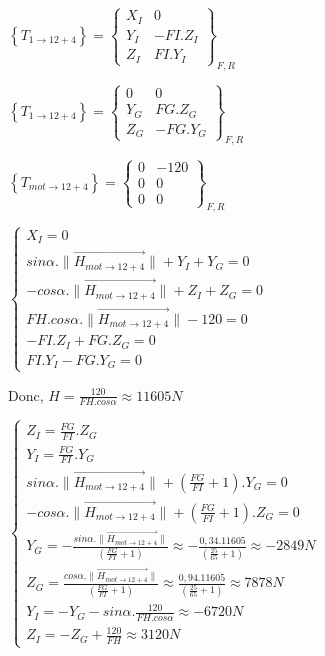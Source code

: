 $\left\{T_{1\rightarrow 12+4}\right\}=\left\{
\begin{array}{cc}
X_I & 0 \\
Y_I & -FI.Z_I \\
Z_I & FI.Y_I
\end{array}
\right\}_{F,R}$

$\left\{T_{1\rightarrow 12+4}\right\}=\left\{
\begin{array}{cc}
0 & 0 \\
Y_G & FG.Z_G \\
Z_G & -FG.Y_G
\end{array}
\right\}_{F,R}$

$\left\{T_{mot\rightarrow 12+4}\right\}=\left\{
\begin{array}{cc}
0 & -120 \\
0 & 0 \\
0 & 0
\end{array}
\right\}_{F,R}$


$\left\{
\begin{array}{l}
X_I=0 \\
sin\alpha.\|\overrightarrow{H_{mot\rightarrow 12+4}}\|+Y_I+Y_G=0 \\
-cos\alpha.\|\overrightarrow{H_{mot\rightarrow 12+4}}\|+Z_I+Z_G=0 \\
FH.cos\alpha.\|\overrightarrow{H_{mot\rightarrow 12+4}}\|-120=0 \\
-FI.Z_I+FG.Z_G=0 \\
FI.Y_I-FG.Y_G=0
\end{array}
\right.$

Donc, $H=\frac{120}{FH.cos\alpha}\approx11605N$

$\left\{\begin{array}{l}
Z_I=\frac{FG}{FI}.Z_G \\
Y_I=\frac{FG}{FI}.Y_G \\
sin\alpha.\|\overrightarrow{H_{mot\rightarrow 12+4}}\|+(\frac{FG}{FI}+1).Y_G=0 \\
-cos\alpha.\|\overrightarrow{H_{mot\rightarrow 12+4}}\|+(\frac{FG}{FI}+1).Z_G=0 \\
Y_G=-\frac{sin\alpha.\|\overrightarrow{H_{mot\rightarrow 12+4}}\|}{(\frac{FG}{FI}+1)}\approx-\frac{0,34.11605}{(\frac{25}{65}+1)}\approx-2849N\\
Z_G=\frac{cos\alpha.\|\overrightarrow{H_{mot\rightarrow 12+4}}\|}{(\frac{FG}{FI}+1)}\approx\frac{0,94.11605}{(\frac{25}{65}+1)}\approx7878N\\
Y_I=-Y_G-sin\alpha.\frac{120}{FH.cos\alpha}\approx -6720N \\
Z_I=-Z_G+\frac{120}{FH}\approx 3120N
\end{array}\right.$

